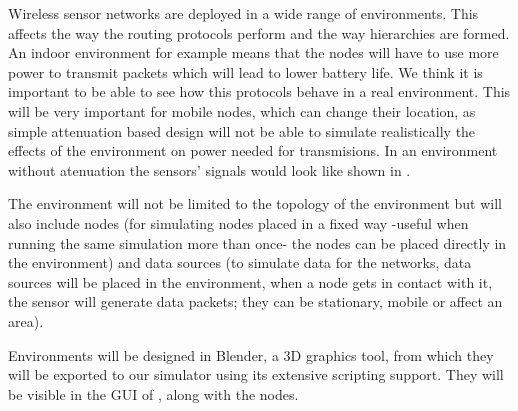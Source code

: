 
Wireless sensor networks are deployed in a wide range of environments. This affects
the way the routing protocols perform and the way hierarchies are formed. An indoor
environment for example means that the nodes will have to use more power to transmit
packets which will lead to lower battery life. We think it is important to be able to
see how this protocols behave in a real environment. This will be very important for
mobile nodes, which can change their location, as simple attenuation based design will
not be able to simulate realistically the effects of the environment on power needed for
transmisions. In an environment without atenuation 
the sensors' signals would look like shown in . 

The environment will not be limited to the topology of the environment but will also 
include nodes (for simulating nodes placed in a fixed way -useful when running the same
simulation more than once- the nodes can be placed directly in the environment) and data sources
(to simulate data for the networks, data sources will be placed in
the environment, when a node gets in contact with it, the sensor will generate data packets; 
they can be stationary, mobile or affect an area).


Environments will be designed in Blender, a 3D graphics tool, from which they will be
exported to our simulator using its extensive scripting support. They will be visible
in the GUI of \codename, along with the nodes.


